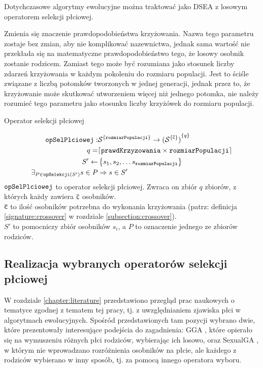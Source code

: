 \documentclass[./FM_mgr.tex]{subfiles}
\begin{document}
Dotychczasowe algorytmy ewolucyjne można traktować jako DSEA z losowym operatorem selekcji płciowej.

Zmienia się znaczenie prawdopodobieństwa krzyżowania. 
Nazwa tego parametru zostaje bez zmian, aby nie komplikować nazewnictwa, jednak sama wartość nie przekłada się na matematyczne prawdopodobieństwo tego, że losowy osobnik zostanie rodzicem. 
Zamiast tego może być rozumiana jako stosunek liczby zdarzeń krzyżowania w każdym pokoleniu do rozmiaru populacji. 
Jest to ściśle związane z liczbą potomków tworzonych w jednej generacji, jednak przez to, że krzyżowanie może skutkować utworzeniem więcej niż jednego potomka, nie należy rozumieć tego parametru jako stosunku liczby krzyżówek do rozmiaru populacji.

\begin{signature}
	\caption{Operator selekcji płciowej \label{signature:genSel}}
	\begin{align}
	\mathtt{opSelPlciowej}: &{ \mathcal{S}}^{ \{ \mathtt{rozmiarPopulacji}  \}} \rightarrow { ( {\mathcal{S}  }^{ \{ \mathsf{\overline{c}} \}} ) }^{ \{ q \}} \\
	q = & \lceil \mathtt{prawdKrzyzowania} \times \mathtt{rozmiarPopulacji} \rceil \\
	S' \gets &\left\{ s_1, s_2, \ldots s_{\mathtt{rozmiarPopulacji}} \right\} \\
	\exists_{P \in \mathtt{opSelekcji}(S')} s \in P &\Rightarrow s \in S'\\
	\end{align}	
	$\mathtt{opSelPlciowej}$ to operator selekcji płciowej.
	Zwraca on zbiór $q$ zbiorów, z których każdy zawiera $\mathsf{\overline{c}}$ osobników. \\
	$\mathsf{\overline{c}}$ to ilość osobników potrzebna do wykonania krzyżowania (patrz: definicja \ref{signature:crossover} w rozdziale \ref{subsection:crossover}). \\
	$S'$ to pomocniczy zbiór osobników $s_i$, a $P$ to oznaczenie jednego ze zbiorów rodziców.
\end{signature}

\subsection{Realizacja wybranych operatorów selekcji płciowej} \label{subsection:literatureRealization}

W rozdziale \ref{chapter:literature} przedstawiono przegląd prac naukowych o tematyce zgodnej z tematem tej pracy, tj. z uwzględnianiem zjawiska płci w algorytmach ewolucyjnych.
Spośród przedstawionych tam pozycji wybrano dwie, które prezentowały interesujące podejścia do zagadnienia: GGA \cite{GGA}, które opierało się na wymuszeniu różnych płci rodziców, wybierając ich losowo, oraz SexualGA \cite{SexualGA}, w którym nie wprowadzano rozróżnienia osobników na płcie, ale każdego z rodziców wybierano w inny sposób, tj. za pomocą innego operatora wyboru.
\end{document}
